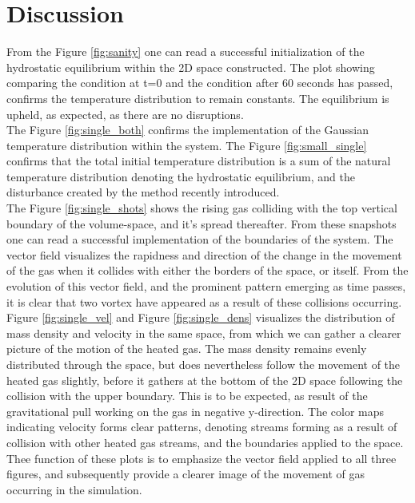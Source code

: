 \documentclass[10pt, nofootinbib, twocolumn]{revtex4-1}
\begin{document}
\section{Discussion}
From the Figure \ref{fig:sanity} one can read a successful initialization of the hydrostatic equilibrium within the 2D space constructed. The plot showing comparing the condition at t=0 and the condition after 60 seconds has passed, confirms the temperature distribution to remain constants. The equilibrium is upheld, as expected, as there are no disruptions. \\

The Figure \ref{fig:single_both} confirms the implementation of the Gaussian temperature distribution within the system. The Figure \ref{fig:small_single} confirms that the total initial temperature distribution is a sum of the natural temperature distribution denoting the hydrostatic equilibrium, and the disturbance created by the method recently introduced. \\

The Figure \ref{fig:single_shots} shows the rising gas colliding with the top vertical boundary of the volume-space, and it's spread thereafter. From these snapshots one can read a successful implementation of the boundaries of the system. The vector field visualizes the rapidness and direction of the change in the movement of the gas when it collides with either the borders of the space, or itself. From the evolution of this vector field, and the prominent pattern emerging as time passes, it is clear that two vortex have appeared as a result of these collisions occurring. Figure \ref{fig:single_vel} and Figure \ref{fig:single_dens} visualizes the distribution of mass density and velocity in the same space, from which we can gather a clearer picture of the motion of the heated gas. The mass density remains evenly distributed through the space, but does nevertheless follow the movement of the heated gas slightly, before it gathers at the bottom of the 2D space following the collision with the upper boundary. This is to be expected, as result of the gravitational pull working on the gas in negative y-direction. The color maps indicating velocity forms clear patterns, denoting streams forming as a result of collision with other heated gas streams, and the boundaries applied to the space. Thee function of these plots is to emphasize the vector field applied to all three figures, and subsequently provide a clearer image of the movement of gas occurring in the simulation.    \\
\end{document}
